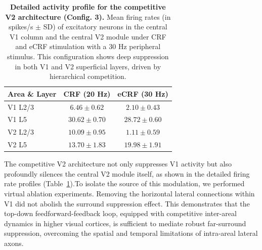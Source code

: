 \begin{table}[t]
  \centering
  \caption{%
    \textbf{Detailed activity profile for the competitive V2 architecture (Config. 3).}
    Mean firing rates (in spikes/s $\pm$ SD) of excitatory neurons in the central V1 column and the central V2 module under CRF and eCRF stimulation with a 30 Hz peripheral stimulus. This configuration shows deep suppression in both V1 and V2 superficial layers, driven by hierarchical competition.
  }
  \label{tab:detailed_activity}
  \begin{tabular}{lcc}
    \toprule
    \textbf{Area \& Layer} & \textbf{CRF (20 Hz)} & \textbf{eCRF (30 Hz)} \\
    \midrule
    V1 L2/3 & $6.46 \pm 0.62$ & $\mathbf{2.10 \pm 0.43}$ \\
    V1 L5 & $30.62 \pm 0.70$ & $\mathbf{28.72 \pm 0.60}$ \\
    \addlinespace
    V2 L2/3 & $10.09 \pm 0.95$ & $\mathbf{1.11 \pm 0.59}$ \\
    V2 L5 & $13.70 \pm 1.83$ & $\mathbf{19.98 \pm 1.91}$ \\
    \bottomrule
  \end{tabular}
\end{table}

The competitive V2 architecture not only suppresses V1 activity but also profoundly silences the central V2 module itself, as shown in the detailed firing rate profiles (Table~\ref{tab:detailed_activity}).To isolate the source of this modulation, we performed virtual ablation experiments. Removing the horizontal lateral connections within V1 did not abolish the surround suppression effect. This demonstrates that the top-down feedforward-feedback loop, equipped with competitive inter-areal dynamics in higher visual cortices, is sufficient to mediate robust far-surround suppression, overcoming the spatial and temporal limitations of intra-areal lateral axons.

%

